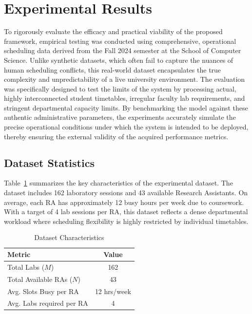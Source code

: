 \documentclass[journal,onecolumn]{IEEEtran}
\begin{document}
\section{Experimental Results}

To rigorously evaluate the efficacy and practical viability of the proposed framework, empirical testing was conducted using comprehensive, operational scheduling data derived from the Fall 2024 semester at the School of Computer Science. Unlike synthetic datasets, which often fail to capture the nuances of human scheduling conflicts, this real-world dataset encapsulates the true complexity and unpredictability of a live university environment. The evaluation was specifically designed to test the limits of the system by processing actual, highly interconnected student timetables, irregular faculty lab requirements, and stringent departmental capacity limits. By benchmarking the model against these authentic administrative parameters, the experiments accurately simulate the precise operational conditions under which the system is intended to be deployed, thereby ensuring the external validity of the acquired performance metrics.

\subsection{Dataset Statistics}
Table~\ref{tab:dataset} summarizes the key characteristics of the experimental dataset. The dataset includes 162 laboratory sessions and 43 available Research Assistants. On average, each RA has approximately 12 busy hours per week due to coursework. With a target of 4 lab sessions per RA, this dataset reflects a dense departmental workload where scheduling flexibility is highly restricted by individual timetables.

\begin{table}[htbp]
\caption{Dataset Characteristics}
\label{tab:dataset}
\begin{center}
\begin{tabular}{|l|c|}
\hline
\textbf{Metric} & \textbf{Value} \\
\hline
Total Labs ($M$) & 162 \\
Total Available RAs ($N$) & 43 \\
Avg. Slots Busy per RA & 12 hrs/week \\
Avg. Labs required per RA & 4 \\
\hline
\end{tabular}
\end{center}
\end{table}
\end{document}
